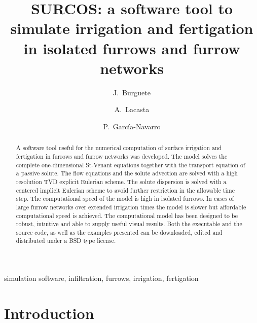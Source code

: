 \documentclass[review,authoryear]{elsarticle}
\begin{document}
\title
{
	SURCOS: a software tool to simulate irrigation and fertigation in isolated 
	furrows and furrow networks
}

\author[rvt1,rvt3]{J.~Burguete}

\author[rvt2]{A.~Lacasta}

\author[rvt2]{P.~García-Navarro}

\address[rvt1]{Soil and Water, EEAD / CSIC.
P.O. Box 13034, 50080~Zaragoza, Spain.}
\address[rvt2]{Fluid Mechanics, LIFTEC, CSIC-Universidad de Zaragoza.
María de Luna 3, 50018~Zaragoza, Spain.}
\address[rvt3]{BIFI: Instituto de Biocomputación y Física de Sistemas Complejos,
Universidad de Zaragoza.
Mariano Esquillor, Edificio I+D, 50009~Zaragoza, Spain.}

\begin{keyword}
simulation software, infiltration, furrows, irrigation, fertigation
\end{keyword}

\begin{abstract}
A software tool useful for the numerical computation of surface irrigation and
fertigation in furrows and furrow networks was developed. The model solves the
complete one-dimensional St-Venant equations together with the transport
equation of a passive solute. The flow equations and the solute advection are
solved with a high resolution TVD explicit Eulerian scheme. The solute
dispersion is solved with a centered implicit Eulerian scheme to avoid further
restriction in the allowable time step. The computational speed of the model is
high in isolated furrows. In cases of large furrow networks over extended
irrigation times the model is slower but affordable computational speed is
achieved. The computational model has been designed to be robust, intuitive and
able to supply useful visual results. Both the executable and the source code,
as well as the examples presented can be downloaded, edited and distributed
under a BSD type license.
\end{abstract}

\maketitle

\section{Introduction}
\end{document}
